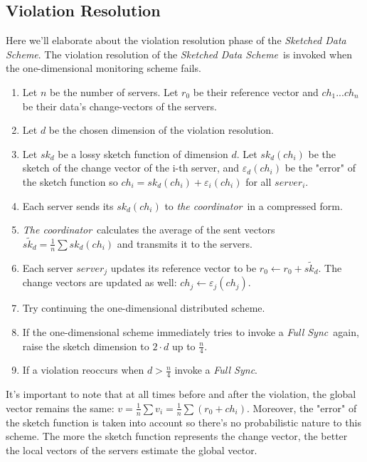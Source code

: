 \documentclass[10pt, conference]{IEEEtran}
\newcommand{\sketchScheme}{\textit{Sketched Data Scheme}}
\newcommand{\fullSync}{\textit{Full Sync}}
\newcommand{\theCoordinator}{\textit{the coordinator}}
\newcommand{\TheCoordinator}{\textit{The coordinator}}
\begin{document}
\subsection{Violation Resolution}
Here we'll elaborate about the violation resolution phase of the \sketchScheme . The violation resolution of the \sketchScheme \ is invoked when the one-dimensional monitoring scheme fails. 
\begin{enumerate}
\item Let $n$ be the number of servers. Let $r_0$ be their reference vector and $ch_1 ... ch_n$ be their data's change-vectors of the servers.
\item Let $d$ be the chosen dimension of the violation resolution.
\item Let $sk_d$ be a lossy sketch function of dimension $d$. Let $sk_d (ch_i)$ be the sketch of the change vector of the i-th server, and $\varepsilon _d(ch_i)$ be the "error" of the sketch function so ${ch_i = sk_d(ch_i) + \varepsilon _i(ch_i)}$ for all $server_i$.
\item Each server sends its $sk_d(ch_i)$ to \theCoordinator \ in a compressed form.
\item \TheCoordinator \ calculates the average of the sent vectors ${\widetilde{sk_d} = \frac{1}{n}\sum sk_d(ch_i)}$ and transmits it to the servers.
\item Each server $server_j$ updates its reference vector to be ${r_0 \leftarrow r_0 + \widetilde{sk_d}}$. The change vectors are updated as well: ${ch_j \leftarrow \varepsilon _j(ch_j)}$.
\item Try continuing the one-dimensional distributed scheme.
\item If the one-dimensional scheme immediately tries to invoke a \fullSync \ again, raise the sketch dimension to $2\cdot d$ up to $\frac{n}{4}$.
\item If a violation reoccurs when ${d > \frac{n}{4}}$ invoke a \fullSync .
\end{enumerate} 
It's important to note that at all times before and after the violation, the global vector remains the same: ${v = \frac{1}{n}\sum v_i=\frac{1}{n}\sum (r_0 + ch_i)}$. Moreover, the "error" of the sketch function is taken into account so there's no probabilistic nature to this scheme. The more the sketch function represents the change vector, the  better the local vectors of the servers estimate the global vector.
\end{document}
